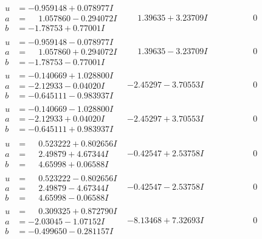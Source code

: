 \documentclass[1p]{elsarticle_modified}
\theoremstyle{definition}
\begin{document}
$$\begin{array}{c|c|c}
\begin{aligned}
u &= -0.959148 + 0.078977 I \\
a &= \phantom{-}1.057860 - 0.294072 I \\
b &= -1.78753 + 0.77001 I\end{aligned}
 & \phantom{-}1.39635 + 3.23709 I & \phantom{-0.000000 } 0 \\ \hline\begin{aligned}
u &= -0.959148 - 0.078977 I \\
a &= \phantom{-}1.057860 + 0.294072 I \\
b &= -1.78753 - 0.77001 I\end{aligned}
 & \phantom{-}1.39635 - 3.23709 I & \phantom{-0.000000 } 0 \\ \hline\begin{aligned}
u &= -0.140669 + 1.028800 I \\
a &= -2.12933 - 0.04020 I \\
b &= -0.645111 - 0.983937 I\end{aligned}
 & -2.45297 - 3.70553 I & \phantom{-0.000000 } 0 \\ \hline\begin{aligned}
u &= -0.140669 - 1.028800 I \\
a &= -2.12933 + 0.04020 I \\
b &= -0.645111 + 0.983937 I\end{aligned}
 & -2.45297 + 3.70553 I & \phantom{-0.000000 } 0 \\ \hline\begin{aligned}
u &= \phantom{-}0.523222 + 0.802656 I \\
a &= \phantom{-}2.49879 + 4.67344 I \\
b &= \phantom{-}4.65998 + 0.06588 I\end{aligned}
 & -0.42547 + 2.53758 I & \phantom{-0.000000 } 0 \\ \hline\begin{aligned}
u &= \phantom{-}0.523222 - 0.802656 I \\
a &= \phantom{-}2.49879 - 4.67344 I \\
b &= \phantom{-}4.65998 - 0.06588 I\end{aligned}
 & -0.42547 - 2.53758 I & \phantom{-0.000000 } 0 \\ \hline\begin{aligned}
u &= \phantom{-}0.309325 + 0.872790 I \\
a &= -2.03045 - 1.07152 I \\
b &= -0.499650 - 0.281157 I\end{aligned}
 & -8.13468 + 7.32693 I & \phantom{-0.000000 } 0 \\ \hline\begin{aligned}

\end{aligned}
\end{array}$$
\end{document}
